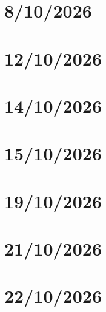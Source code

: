 \chapter{8/10/2026}

\chapter{12/10/2026}

\chapter{14/10/2026}

\chapter{15/10/2026}

\chapter{19/10/2026}

\chapter{21/10/2026}

\chapter{22/10/2026}

